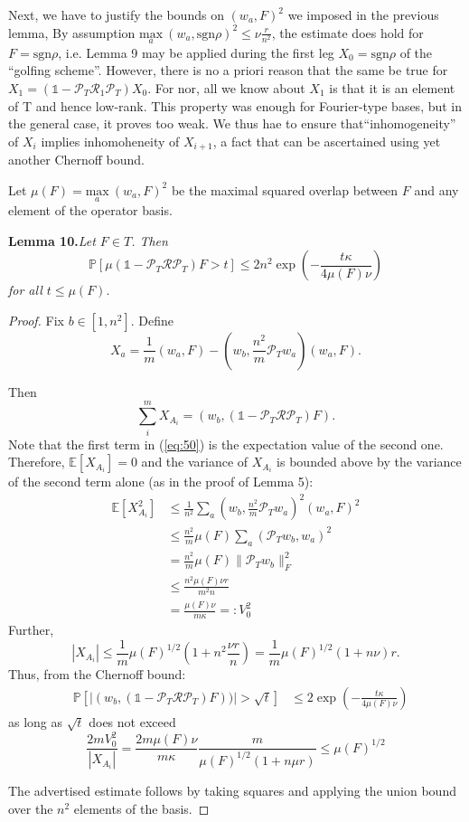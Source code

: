 \documentclass{article}
\begin{document}
Next, we have to justify the bounds on $(w_a,F)^2$ we imposed in the previous lemma, By assumption $\underset{a} {\mathrm{max}} ~(w_a,\text{sgn}\rho)^2 \le \nu\frac{r}{n^2}$, the estimate does hold for $F = \text{sgn} \rho$, i.e. Lemma 9 may be applied during the first leg $X_0 = \text{sgn} \rho$ of the ``golfing scheme''. However, there is no a priori reason that the same be true for $X_1 = (\mathbb{1}-\mathcal{P}_T\mathcal{R}_1\mathcal{P}_T)X_0$. For nor, all we know about $X_1$ is that it is an element of T and hence low-rank. This property was enough for Fourier-type bases, but in the general case, it proves too weak. We thus hae to ensure that``inhomogeneity'' of $X_i$ implies inhomoheneity of $X_{i+1}$, a fact that can be ascertained using yet another Chernoff bound.

Let $\mu(F) = \underset{a} {\mathrm{max}} ~(w_a,F)^2$ be the maximal squared overlap between $F$ and any element of the operator basis.

\textbf{Lemma 10.}\textit{Let $F \in T$. Then}
\[
\mathbb{P}[ \mu(\mathbb{1}-\mathcal{P}_T\mathcal{R}\mathcal{P}_T)F > t] \le 2n^2 \exp \left( -\frac{t\kappa}{4\mu(F)\nu}\right)
\]
\textit{for all $t \le \mu(F)$}.
\begin{proof}
Fix $b \in [1,n^2]$. Define
\begin{equation}
X_a = \frac{1}{m}(w_a,F)-(w_b,\frac{n^2}{m}\mathcal{P}_Tw_a)(w_a,F).
\label{eq:50}
\end{equation}  

Then
\[
\sum_i^m X_{A_i} = (w_b,(\mathbb{1}-\mathcal{P}_T\mathcal{R}\mathcal{P}_T)F).
\]
Note that the first term in (\ref{eq:50}) is the expectation value of the second one. Therefore, $\mathbb{E}[X_{A_i}]=0$ and the variance of $X_{A_i}$ is bounded above by the variance of the second term alone (as in the proof of Lemma 5):
\begin{align*}
\mathbb{E}[X_{A_i}^2] & \le \frac{1}{n^2}\sum_a(w_b,\frac{n^2}{m}\mathcal{P}_Tw_a)^2(w_a,F)^2\\
& \le \frac{n^2}{m}\mu(F)\sum_a(\mathcal{P}_Tw_b,w_a)^2\\
& =  \frac{n^2}{m}\mu(F)\|\mathcal{P}_Tw_b\|_F^2\\
& \le \frac{n^2\mu(F)\nu r}{m^2n}\\
& = \frac{\mu(F)\nu}{m\kappa} =: V_0^2
\end{align*}
Further,
\[
|X_{A_i}| \le \frac{1}{m}\mu(F)^{1/2}\left(1+n^2\frac{\nu r}{n}\right) = \frac{1}{m}\mu(F)^{1/2}(1+n\nu)r.
\]
Thus, from the Chernoff bound:
\begin{align*}
& \mathbb{P}\left[|(w_b,(\mathbb{1}-\mathcal{P}_T\mathcal{R}\mathcal{P}_T)F))|> \sqrt{t} \right] 
&\le 2\exp\left(-\frac{t\kappa}{4\mu(F)\nu}\right)
\end{align*}
as long as $\sqrt{t}$ does not exceed
\[
\frac{2mV_0^2}{|X_{A_i}|} = \frac{2m\mu(F)\nu}{m\kappa}\frac{m}{\mu(F)^{1/2}(1+n\mu r)}\le \mu(F)^{1/2}
\]

The advertised estimate follows by taking squares and applying the union bound over the $n^2$ elements of the basis.
\end{proof}
\end{document}
